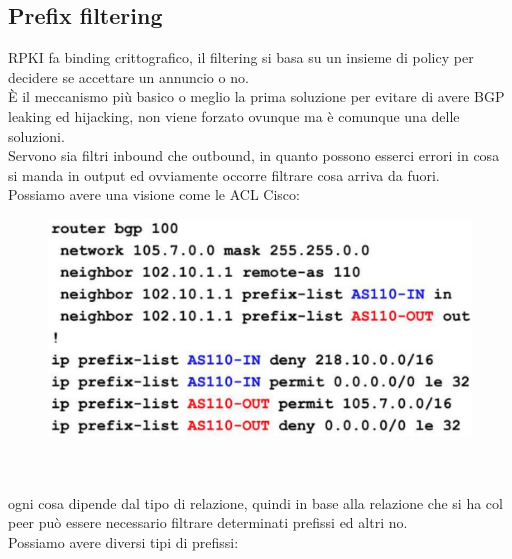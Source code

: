 \documentclass[12pt, oneside]{extbook} %
\begin{document}
\subsection{Prefix filtering}
RPKI fa binding crittografico, il filtering si basa su un insieme di policy per decidere se accettare un annuncio o no.
\\È il meccanismo più basico o meglio la prima soluzione per evitare di avere BGP leaking ed hijacking, non viene forzato ovunque ma è comunque una delle soluzioni.
\\Servono sia filtri inbound che outbound, in quanto possono esserci errori in cosa si manda in output ed ovviamente occorre filtrare cosa arriva da fuori.
\\Possiamo avere una visione come le ACL Cisco:\\
\begin{figure}[h!]
    \centering
    \includegraphics[scale=0.5]{../../immagini/acl_cisco}
\end{figure}\\\\
ogni cosa dipende dal tipo di relazione, quindi in base alla relazione che si ha col peer può essere necessario filtrare determinati prefissi ed altri no.
\\Possiamo avere diversi tipi di prefissi:
\end{document}
